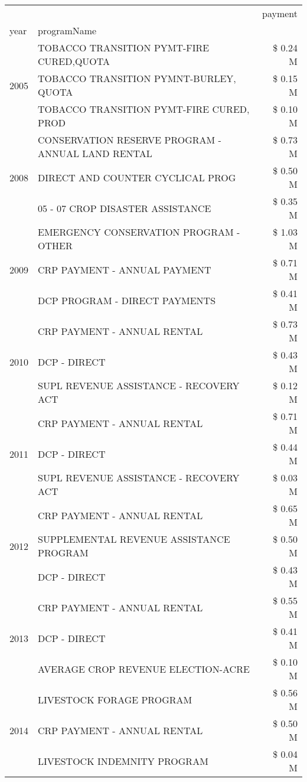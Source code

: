 \begin{tabular}{llr}
\toprule
 &  & payment \\
year & programName &  \\
\midrule
\multirow[t]{3}{*}{2005} & TOBACCO TRANSITION PYMT-FIRE CURED,QUOTA & \$ 0.24 M \\
 & TOBACCO TRANSITION PYMNT-BURLEY, QUOTA & \$ 0.15 M \\
 & TOBACCO TRANSITION PYMT-FIRE CURED, PROD & \$ 0.10 M \\
\cline{1-3}
\multirow[t]{3}{*}{2008} & CONSERVATION RESERVE PROGRAM - ANNUAL LAND RENTAL & \$ 0.73 M \\
 & DIRECT AND COUNTER CYCLICAL PROG & \$ 0.50 M \\
 & 05 - 07 CROP DISASTER ASSISTANCE & \$ 0.35 M \\
\cline{1-3}
\multirow[t]{3}{*}{2009} & EMERGENCY CONSERVATION PROGRAM - OTHER & \$ 1.03 M \\
 & CRP PAYMENT - ANNUAL PAYMENT & \$ 0.71 M \\
 & DCP PROGRAM - DIRECT PAYMENTS & \$ 0.41 M \\
\cline{1-3}
\multirow[t]{3}{*}{2010} & CRP PAYMENT - ANNUAL RENTAL & \$ 0.73 M \\
 & DCP - DIRECT & \$ 0.43 M \\
 & SUPL REVENUE ASSISTANCE - RECOVERY ACT & \$ 0.12 M \\
\cline{1-3}
\multirow[t]{3}{*}{2011} & CRP PAYMENT - ANNUAL RENTAL & \$ 0.71 M \\
 & DCP - DIRECT & \$ 0.44 M \\
 & SUPL REVENUE ASSISTANCE - RECOVERY ACT & \$ 0.03 M \\
\cline{1-3}
\multirow[t]{3}{*}{2012} & CRP PAYMENT - ANNUAL RENTAL & \$ 0.65 M \\
 & SUPPLEMENTAL REVENUE ASSISTANCE PROGRAM & \$ 0.50 M \\
 & DCP - DIRECT & \$ 0.43 M \\
\cline{1-3}
\multirow[t]{3}{*}{2013} & CRP PAYMENT - ANNUAL RENTAL & \$ 0.55 M \\
 & DCP - DIRECT & \$ 0.41 M \\
 & AVERAGE CROP REVENUE ELECTION-ACRE & \$ 0.10 M \\
\cline{1-3}
\multirow[t]{3}{*}{2014} & LIVESTOCK FORAGE PROGRAM & \$ 0.56 M \\
 & CRP PAYMENT - ANNUAL RENTAL & \$ 0.50 M \\
 & LIVESTOCK INDEMNITY PROGRAM & \$ 0.04 M \\

\end{tabular}
